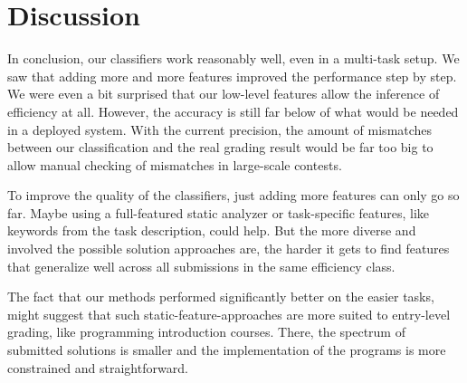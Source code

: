 \newpage
\section{Discussion}

In conclusion, our classifiers work reasonably well, even in a multi-task setup. We saw that adding more and more features improved the performance step by step. We were even a bit surprised that our low-level features allow the inference of efficiency at all. However, the accuracy is still far below of what would be needed in a deployed system. With the current precision, the amount of mismatches between our classification and the real grading result would be far too big to allow manual checking of mismatches in large-scale contests.

To improve the quality of the classifiers, just adding more features can only go so far. Maybe using a full-featured static analyzer or task-specific features, like keywords from the task description, could help. But the more diverse and involved the possible solution approaches are, the harder it gets to find features that generalize well across all submissions in the same efficiency class.

The fact that our methods performed significantly better on the easier tasks, might suggest that such static-feature-approaches are more suited to entry-level grading, like programming introduction courses. There, the spectrum of submitted solutions is smaller and the implementation of the programs is more constrained and straightforward.

